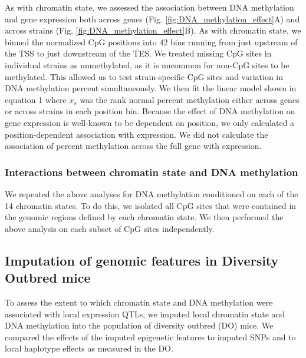 \documentclass[
  11pt,
]{article}
\begin{document}
As with chromatin state, we assessed the association between DNA
methylation and gene expression both across genes (Fig.
\ref{fig:DNA_methylation_effect}A) and across strains (Fig.
\ref{fig:DNA_methylation_effect}B). As with chromatin state, we binned
the normalized CpG positions into 42 bins running from just upstream of
the TSS to just downstream of the TES. We treated missing CpG sites in
individual strains as unmethylated, as it is uncommon for non-CpG sites
to be methylated. This allowed us to test strain-specific CpG sites and
variation in DNA methylation percent simultaneously. We then fit the
linear model shown in equation 1 where \(x_{s}\) was the rank normal
percent methylation either across genes or across strains in each
position bin. Because the effect of DNA methylation on gene expression
is well-known to be dependent on position, we only calculated a
position-dependent association with expression. We did not calculate the
association of percent methylation across the full gene with expression.

\hypertarget{interactions-between-chromatin-state-and-dna-methylation-1}{%
\subsubsection{Interactions between chromatin state and DNA
methylation}\label{interactions-between-chromatin-state-and-dna-methylation-1}}

We repeated the above analyses for DNA methylation conditioned on each
of the 14 chromatin states. To do this, we isolated all CpG sites that
were contained in the genomic regions defined by each chromatin state.
We then performed the above analysis on each subset of CpG sites
independently.

\hypertarget{imputation-of-genomic-features-in-diversity-outbred-mice}{%
\subsection{Imputation of genomic features in Diversity Outbred
mice}\label{imputation-of-genomic-features-in-diversity-outbred-mice}}

To assess the extent to which chromatin state and DNA methylation were
associated with local expression QTLs, we imputed local chromatin state
and DNA methylation into the population of diversity outbred (DO) mice.
We compared the effects of the imputed epigenetic features to imputed
SNPs and to local haplotype effects as measured in the DO.
\end{document}
